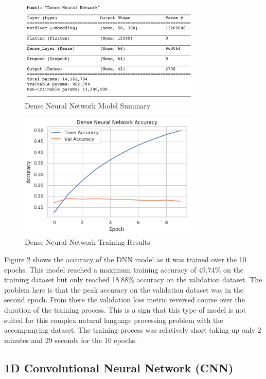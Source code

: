 \documentclass[5p,authoryear]{elsarticle}
\begin{document}
\begin{figure}[!htb] \centering
	\includegraphics[width=3.4in]{figures/DNN_Model.png}
	\caption[]{Dense Neural Network Model Summary } 
	\label{DNN Summary} 
\end{figure}


\begin{figure}[!htb] \centering
	\includegraphics[width=3.4in]{figures/DNN_Accuracy.png}
	\caption[]{Dense Neural Network Training Results} 
	\label{DNN Results} 
\end{figure}


Figure \ref{DNN Results} shows the accuracy of the DNN model as it was trained over the 10 epochs. This model reached a maximum training accuracy of 49.74\% on the training dataset but only reached 18.88\% accuracy on the validation dataset. The problem here is that the peak accuracy on the validation dataset was in the second epoch. From there the validation loss metric reversed course over the duration of the training process. This is a sign that this type of model is not suited for this complex natural language processing problem with the accompanying dataset. The training process was relatively short taking up only 2 minutes and 29 seconds for the 10 epochs.  


\subsection{1D Convolutional Neural Network (CNN)}
\end{document}
